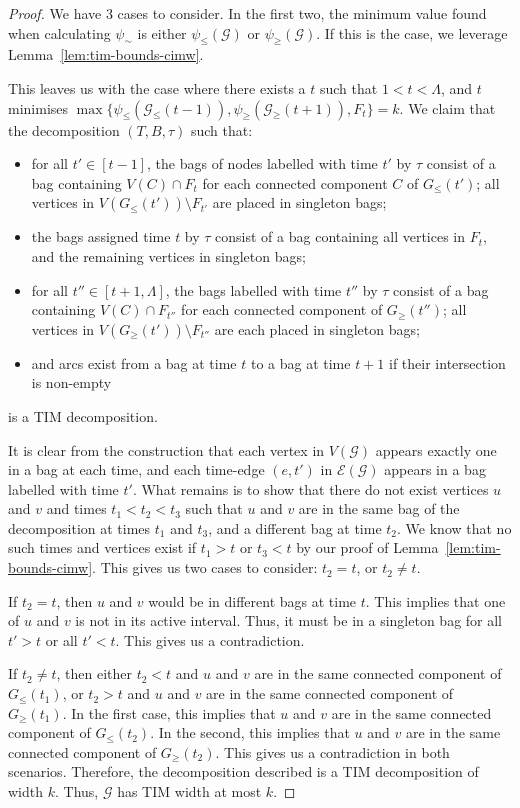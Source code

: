 \documentclass[a4paper,UKenglish,cleveref, autoref, thm-restate]{lipics-v2021} %
\begin{document}
\begin{proof}
    We have 3 cases to consider. In the first two, the minimum value found when calculating $\psi_{\sim}$ is either $\psi_{\leq}(\mathcal{G})$ or $\psi_{\geq}(\mathcal{G})$. If this is the case, we leverage Lemma~\ref{lem:tim-bounds-cimw}.

    This leaves us with the case where there exists a $t$ such that $1<t<\Lambda$, and $t$ minimises $\max\{\psi_{\leq}(\mathcal{G}_{\leq}(t-1)),\psi_{\geq}(\mathcal{G}_{\geq}(t+1)), F_t\}=k$. We claim that the decomposition $(T,B,\tau)$ such that:
    \begin{itemize}
        \item for all $t'\in [t-1]$, the bags of nodes labelled with time $t'$ by $\tau$ consist of a bag containing $V(C)\cap F_t$ for each connected component $C$ of $G_{\leq}(t')$; all vertices in $V(G_{\leq}(t'))\setminus F_{t'}$ are placed in singleton bags;
        \item the bags assigned time $t$ by $\tau$ consist of a bag containing all vertices in $F_{t}$, and the remaining vertices in singleton bags;
        \item for all $t''\in [t+1,\Lambda]$, the bags labelled with time $t''$ by $\tau$ consist of a bag containing $V(C)\cap F_{t''}$ for each connected component of $G_{\geq}(t'')$; all vertices in $V(G_{\geq}(t'))\setminus F_{t''}$ are each placed in singleton bags; 
        \item and arcs exist from a bag at time $t$ to a bag at time $t+1$ if their intersection is non-empty
    \end{itemize}
    is a TIM decomposition. 
    
    It is clear from the construction that each vertex in $V(\mathcal{G})$ appears exactly one in a bag at each time, and each time-edge $(e,t')$ in $\mathcal{E}(\mathcal{G})$ appears in a bag labelled with time $t'$. What remains is to show that there do not exist vertices $u$ and $v$ and times $t_1<t_2<t_3$ such that $u$ and $v$ are in the same bag of the decomposition at times $t_1$ and $t_3$, and a different bag at time $t_2$. We know that no such times and vertices exist if $t_1>t$ or $t_3<t$ by our proof of Lemma~\ref{lem:tim-bounds-cimw}. This gives us two cases to consider: $t_2=t$, or $t_2\neq t$.

    If $t_2=t$, then $u$ and $v$ would be in different bags at time $t$. This implies that one of $u$ and $v$ is not in its active interval. Thus, it must be in a singleton bag for all $t'>t$ or all $t'<t$. This gives us a contradiction.

    If $t_2 \neq t$, then either $t_2<t$ and $u$ and $v$ are in the same connected component of $G_{\leq}(t_1)$, or $t_2>t$ and $u$ and $v$ are in the same connected component of $G_{\geq}(t_1)$. In the first case, this implies that $u$ and $v$ are in the same connected component of $G_{\leq}(t_2)$. In the second, this implies that $u$ and $v$ are in the same connected component of $G_{\geq}(t_2)$. This gives us a contradiction in both scenarios. Therefore, the decomposition described is a TIM decomposition of width $k$. Thus, $\mathcal{G}$ has TIM width at most $k$.
\end{proof}
\end{document}
